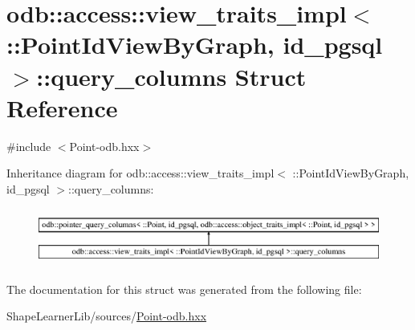 \hypertarget{structodb_1_1access_1_1view__traits__impl_3_01_1_1_point_id_view_by_graph_00_01id__pgsql_01_4_1_1query__columns}{}\section{odb\+:\+:access\+:\+:view\+\_\+traits\+\_\+impl$<$ \+:\+:Point\+Id\+View\+By\+Graph, id\+\_\+pgsql $>$\+:\+:query\+\_\+columns Struct Reference}
\label{structodb_1_1access_1_1view__traits__impl_3_01_1_1_point_id_view_by_graph_00_01id__pgsql_01_4_1_1query__columns}


{\ttfamily \#include $<$Point-\/odb.\+hxx$>$}

Inheritance diagram for odb\+:\+:access\+:\+:view\+\_\+traits\+\_\+impl$<$ \+:\+:Point\+Id\+View\+By\+Graph, id\+\_\+pgsql $>$\+:\+:query\+\_\+columns\+:\begin{figure}[H]
\begin{center}
\leavevmode
\includegraphics[height=1.921098cm]{d2/d68/structodb_1_1access_1_1view__traits__impl_3_01_1_1_point_id_view_by_graph_00_01id__pgsql_01_4_1_1query__columns}
\end{center}
\end{figure}


The documentation for this struct was generated from the following file\+:\begin{DoxyCompactItemize}
\item 
Shape\+Learner\+Lib/sources/\hyperlink{_point-odb_8hxx}{Point-\/odb.\+hxx}\end{DoxyCompactItemize}

